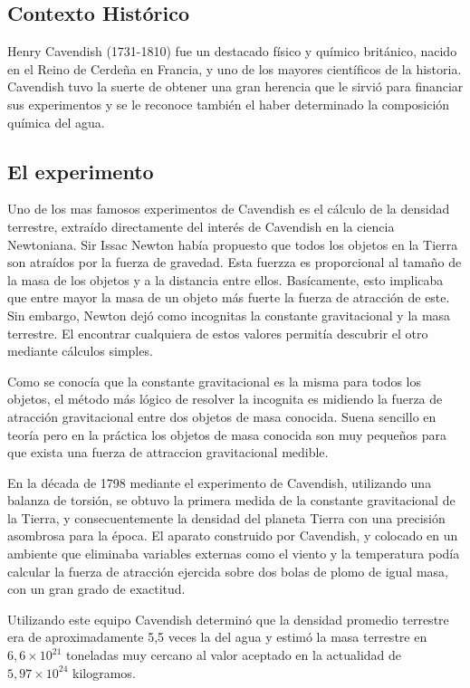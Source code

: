 \documentclass[journal]{IEEEtran}
\begin{document}
\subsection{Contexto Histórico}
Henry Cavendish (1731-1810) fue un destacado físico y químico británico,
 nacido en el Reino de Cerdeña en Francia, y uno de los mayores científicos de la historia.
 Cavendish tuvo la suerte de obtener una gran herencia que le sirvió para financiar sus experimentos
 y se le reconoce también el haber determinado la composición química del agua.
 
 \subsection{El experimento}
Uno de los mas famosos experimentos de Cavendish es el cálculo de la densidad terrestre, extraído directamente
del interés de Cavendish en la ciencia Newtoniana.
Sir Issac Newton había propuesto que todos los objetos en la Tierra son atraídos por la fuerza
de gravedad. Esta fuerzza es proporcional al tamaño de la masa de los objetos y a la distancia entre ellos. Basícamente, esto implicaba 
que entre mayor la masa de un objeto más fuerte la fuerza de atracción de este.
Sin embargo, Newton dejó como incognitas la constante gravitacional y la masa terrestre. El encontrar cualquiera de estos valores permitía
descubrir el otro mediante cálculos simples.

Como se conocía que la constante gravitacional es la misma para todos los objetos, el método más lógico de resolver
la incognita es midiendo la fuerza de atracción gravitacional entre dos objetos de masa conocida. Suena sencillo en teoría pero en la práctica
los objetos de masa conocida son muy pequeños para que exista una fuerza de attraccion gravitacional medible.

En la década de 1798 mediante el experimento de Cavendish, utilizando una balanza de torsión, se obtuvo la primera
medida de la constante gravitacional de la Tierra, y consecuentemente la densidad del planeta Tierra con una precisión asombrosa para la época.
El aparato construido por Cavendish, y colocado en un ambiente que eliminaba variables externas como el viento y la temperatura
podía calcular la fuerza de atracción ejercida sobre dos bolas de plomo de igual masa, con un gran grado de exactitud.

Utilizando este equipo Cavendish determinó que la densidad promedio
terrestre era de aproximadamente 5,5 veces la del agua y estimó 
la masa terrestre en $6,6 \times 10^{21}$
toneladas muy cercano al valor aceptado en la actualidad de
$5,97 \times 10^{24}$ kilogramos.\cite{shectman_2003}
\end{document}
